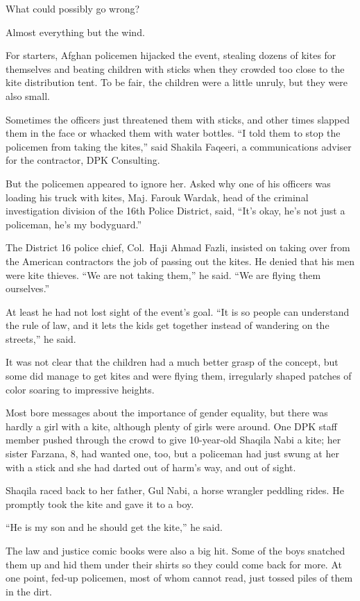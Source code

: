 ﻿\documentclass[12pt]{article}
\begin{document}
What could possibly go wrong?

Almost everything but the wind.

For starters, Afghan policemen hijacked the event, stealing dozens of kites for themselves and
beating children with sticks when they crowded too close to the kite distribution tent. To be fair,
the children were a little unruly, but they were also small.

Sometimes the officers just threatened them with sticks, and other times slapped them in the face or
whacked them with water bottles. ``I told them to stop the policemen from taking the kites,'' said
Shakila Faqeeri, a communications adviser for the contractor, DPK Consulting.

But the policemen appeared to ignore her. Asked why one of his officers was loading his truck with
kites, Maj. Farouk Wardak, head of the criminal investigation division of the 16th Police District,
said, ``It's okay, he's not just a policeman, he's my bodyguard.''

The District 16 police chief, Col.~Haji Ahmad Fazli, insisted on taking over from the American
contractors the job of passing out the kites. He denied that his men were kite thieves. ``We are not
taking them,'' he said. ``We are flying them ourselves.''

At least he had not lost sight of the event's goal. ``It is so people can understand the rule of
law, and it lets the kids get together instead of wandering on the streets,'' he said.

It was not clear that the children had a much better grasp of the concept, but some did manage to
get kites and were flying them, irregularly shaped patches of color soaring to impressive heights.

Most bore messages about the importance of gender equality, but there was hardly a girl with a kite,
although plenty of girls were around. One DPK staff member pushed through the crowd to give
10-year-old Shaqila Nabi a kite; her sister Farzana, 8, had wanted one, too, but a policeman had
just swung at her with a stick and she had darted out of harm's way, and out of sight.

Shaqila raced back to her father, Gul Nabi, a horse wrangler peddling rides. He promptly took the
kite and gave it to a boy.

``He is my son and he should get the kite,'' he said.

The law and justice comic books were also a big hit. Some of the boys snatched them up and hid them
under their shirts so they could come back for more. At one point, fed-up policemen, most of whom
cannot read, just tossed piles of them in the dirt.
\end{document}
